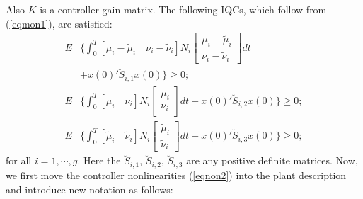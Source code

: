\documentclass[twocolumn]{autart}
\begin{document}
\noindent Also $K$ is a controller gain matrix. 
The following IQCs, which follow from (\ref{eqmon1}), are satisfied:
\begin{align}
\label{eqIQC2}
E&\big\{\int_0^T[\mu_i-\tilde{\mu}_i \quad \nu_i-\tilde{\nu}_i] N_i\left[
\begin{array}{c}
{\mu}_i-\tilde{\mu}_i\\
\nu_i-\tilde{\nu}_i
\end{array}\right]dt\nonumber \\ 
&+x(0)'\breve{S}_{i,1}x(0)\big\}\geq0;\\
\label{eqIQC3}
E&\big\{\int_0^T[\mu_i \quad \nu_i] N_i\left[
\begin{array}{c}
{\mu}_i\\
\nu_i
\end{array}\right]dt+x(0)'\breve{S}_{i,2}x(0)\big\}\geq0;\\
\label{eqIQC4}
E&\big\{\int_0^T[\tilde{\mu}_i \quad \tilde{\nu}_i] N_i\left[
\begin{array}{c}
\tilde{\mu}_i\\
\tilde{\nu}_i
\end{array}\right]dt+x(0)'\breve{S}_{i,3}x(0)\big\}\geq0;
\end{align}
for all $i=1, \cdots , g$. Here the $\breve{S}_{i,1}$, $\breve{S}_{i,2}$, $\breve{S}_{i,3}$ are any positive definite matrices.  
Now, we first move the controller nonlinearities (\ref{eqnon2}) into the plant description and introduce new notation as follows:
\end{document}

